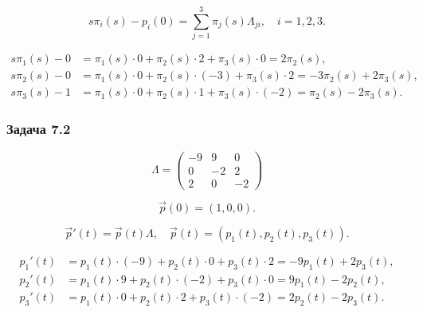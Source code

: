 \[
	s \pi_i(s)-p_i(0) = \sum_{j=1}^3 \pi_j(s)\Lambda_{ji},\quad i=1,2,3.
\]

\[
	\begin{aligned}
		s \pi_1(s)-0 & = \pi_1(s)\cdot 0 + \pi_2(s)\cdot 2 + \pi_3(s)\cdot 0 = 2\pi_2(s),              \\
		s \pi_2(s)-0 & = \pi_1(s)\cdot 0 + \pi_2(s)\cdot(-3) + \pi_3(s)\cdot 2 = -3\pi_2(s)+2\pi_3(s), \\
		s \pi_3(s)-1 & = \pi_1(s)\cdot 0 + \pi_2(s)\cdot 1 + \pi_3(s)\cdot(-2) = \pi_2(s)-2\pi_3(s).
	\end{aligned}
\]




\subsubsection*{Задача 7.2}




\[
	\Lambda =
	\begin{pmatrix}
		-9 & 9  & 0  \\
		0  & -2 & 2  \\
		2  & 0  & -2
	\end{pmatrix}
\]

\[
	\vec{p}(0) = (1,0,0).
\]

\[
	\vec{p}'(t) = \vec{p}(t)\Lambda,\quad \vec{p}(t)=(p_1(t),p_2(t),p_3(t)).
\]

\[
	\begin{aligned}
		p_1'(t) & =  p_1 (t)\cdot(-9) + p_2(t)\cdot 0 + p_3(t)\cdot 2 = -9p_1(t)+2p_3(t), \\
		p_2'(t) & =  p_1 (t)\cdot 9 + p_2(t)\cdot(-2) + p_3(t)\cdot 0 = 9p_1(t)-2p_2(t),  \\
		p_3'(t) & =  p_1 (t)\cdot 0 + p_2(t)\cdot 2 + p_3(t)\cdot(-2) = 2p_2(t)-2p_3(t).
	\end{aligned}
\]

